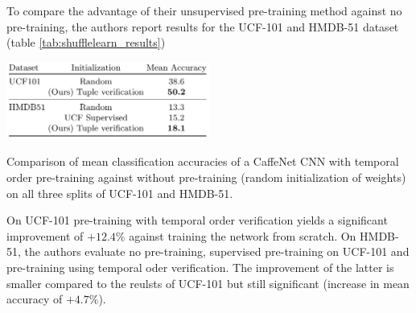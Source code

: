 To compare the advantage of their unsupervised pre-training method against no pre-training, the authors report results for the UCF-101 and HMDB-51 dataset (table \ref{tab:shufflelearn_results})

\begin{table}[H]
    \centering
    \includegraphics[width=0.5\textwidth]{img_deep/shufflelearn_results}
    \caption{Comparison of mean classification accuracies of a CaffeNet CNN with temporal order pre-training against without pre-training (random initialization of weights) on all three splits of UCF-101 and HMDB-51. \cite{misra_shuffle_2016}}
    \label{tab:shufflelearn_results}
\end{table}

On UCF-101 pre-training with temporal order verification yields a significant improvement of $+12.4\%$ against training the network from scratch.
On HMDB-51, the authors evaluate no pre-training, supervised pre-training on UCF-101 and pre-training using temporal oder verification.
The improvement of the latter is smaller compared to the reulsts of UCF-101 but still significant (increase in mean accuracy of $+4.7\%$).
